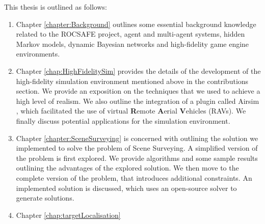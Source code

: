 This thesis is outlined as follows: 
\begin{enumerate}
    \item Chapter \ref{chapter:Background} outlines some essential background knowledge related to the ROCSAFE project, agent and multi-agent systems, hidden Markov models, dynamic Bayesian networks and high-fidelity game engine environments. 
    \item Chapter \ref{chap:HighFidelitySim} provides the details of the development of the high-fidelity simulation environment mentioned above in the contributions section. We provide an exposition on the techniques that we used to achieve a high level of realism. We also outline the integration of a plugin called Airsim \cite{Shah2017AirSim:Vehicles}, which facilitated the use of virtual \textbf{R}emote \textbf{A}erial \textbf{V}ehicles (RAVs). We finally discuss potential applications for the simulation environment.
    \item Chapter \ref{chapter:SceneSurveying} is concerned with outlining the solution we implemented to solve the problem of Scene Surveying. A simplified version of the problem is first explored. We provide algorithms and some sample results outlining the advantages of the explored solution. We then move to the complete version of the problem, that introduces additional constraints. An implemented solution is discussed, which uses an open-source solver to generate solutions. 
    \item Chapter \ref{chap:targetLocalisation}
\end{enumerate}